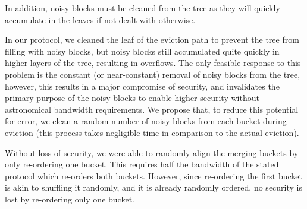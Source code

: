 \documentclass[12pt, oneside]{article}   	%
\begin{document}
In addition, noisy blocks must be cleaned from the tree as they will quickly accumulate in the leaves if not dealt with otherwise.

In our protocol, we cleaned the leaf of the eviction path to prevent the tree from filling with noisy blocks, but noisy blocks still accumulated quite quickly in higher layers of the tree, resulting in overflows. The only feasible response to this problem is the constant (or near-constant) removal of noisy blocks from the tree, however, this results in a major compromise of security, and invalidates the primary purpose of the noisy blocks to enable higher security without astronomical bandwidth requirements. We propose that, to reduce this potential for error, we clean a random number of noisy blocks from each bucket during eviction (this process takes negligible time in comparison to the actual eviction).

Without loss of security, we were able to randomly align the merging buckets by only re-ordering one bucket. This requires half the bandwidth of the stated protocol which re-orders both buckets. However, since re-ordering the first bucket is akin to shuffling it randomly, and it is already randomly ordered, no security is lost by re-ordering only one bucket.



\end{document}

